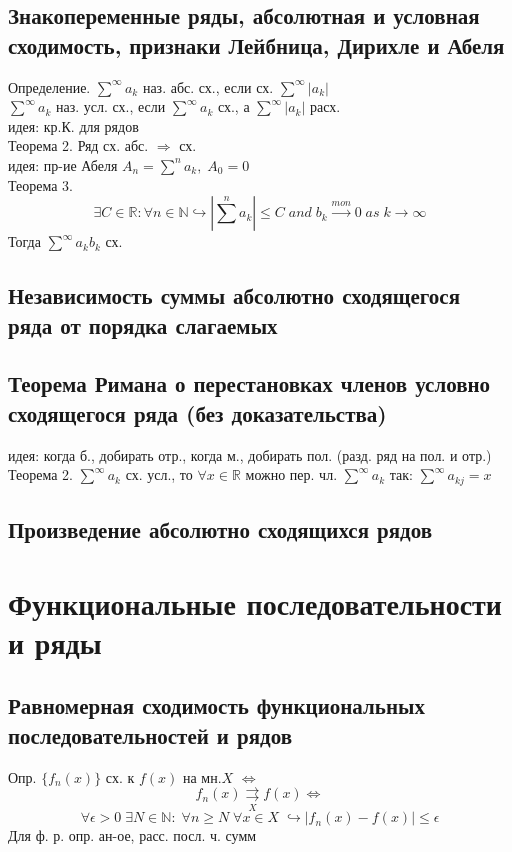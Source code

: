 \documentclass{article}
\begin{document}
\subsection{Знакопеременные ряды, абсолютная и условная сходимость, признаки Лейбница, Дирихле и Абеля}
Определение. $\overset{\infty}{\sum} a_k$ наз. абс. сх., если сх. $\overset{\infty}{\sum} |a_k|$ \\
$\overset{\infty}{\sum} a_k$ наз. усл. сх., если $\overset{\infty}{\sum} a_k$ сх., а $\overset{\infty}{\sum} |a_k|$ расх. \\
идея: кр.К. для рядов \\
Теорема 2. Ряд сх. абс. $\Rightarrow$ сх. \\
идея: пр-ие Абеля $A_n = \overset{n}{\sum} a_k, \; A_0 = 0 $ \\
Теорема 3.
\begin{equation*}
    \exists C \in \mathbb R: \forall n \in \mathbb N \hookrightarrow |\overset{n}{\sum} a_k| \leq C \; and \; b_k \overset{mon}{\rightarrow} 0 \; as \; k \rightarrow \infty
\end{equation*}
Тогда $\overset{\infty}{\sum} a_k b_k$ сх.
\subsection{Независимость суммы абсолютно сходящегося ряда от порядка слагаемых}
\subsection{Теорема Римана о перестановках
членов условно сходящегося ряда (без доказательства)}
идея: когда б., добирать отр., когда м., добирать пол. (разд. ряд на пол. и отр.) \\
Теорема 2. $\overset{\infty}{\sum} a_k$ сх. усл., то $\forall x \in \mathbb R$ можно пер. чл. $\overset{\infty}{\sum} a_k$ так: $\overset{\infty}{\sum} a_{kj} = x$
\subsection{Произведение абсолютно сходящихся рядов}


\newpage
\section{Функциональные последовательности и ряды}
\subsection{Равномерная сходимость функциональных последовательностей и рядов}
Опр. $\{ f_n (x) \}$ сх. к $f(x)$ на мн.$X$ $\Leftrightarrow$
\begin{equation*}
    f_n (x) \underset{X}{\rightrightarrows} f(x) \Leftrightarrow
\end{equation*}
\begin{equation*}
    \forall \epsilon > 0 \; \exists N \in \mathbb N: \; \forall n \geq N \; \forall x \in X \; \hookrightarrow |f_n (x) - f(x)| \leq \epsilon
\end{equation*}
Для ф. р. опр. ан-ое, расс. посл. ч. сумм
\end{document}
